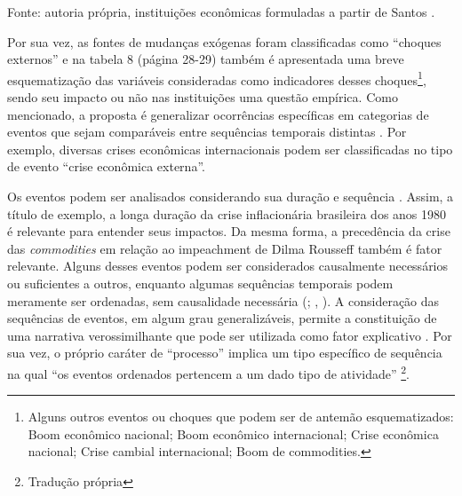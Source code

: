 \begin{table}[htbp]
\centering
\caption{Conjuntos preliminares de instituições relevantes}
\label{tab:cap03-conjuntos-instituicoes}
\end{table}

Fonte: autoria própria, instituições econômicas formuladas a partir de
Santos .

Por sua vez, as fontes de mudanças exógenas foram classificadas como
``choques externos'' e na tabela 8 (página 28-29) também é apresentada
uma breve esquematização das variáveis consideradas como indicadores
desses choques\footnote{Alguns outros eventos ou choques que podem ser
  de antemão esquematizados: Boom econômico nacional; Boom econômico
  internacional; Crise econômica nacional; Crise cambial internacional;
  Boom de commodities.}, sendo seu impacto ou não nas instituições uma
questão empírica. Como mencionado, a proposta é generalizar ocorrências
específicas em categorias de eventos que sejam comparáveis entre
sequências temporais distintas \citep{mahoneyfalleti2015}. Por exemplo,
diversas crises econômicas internacionais podem ser classificadas no
tipo de evento ``crise econômica externa''.

Os eventos podem ser analisados considerando sua duração e sequência
\citep{mahoneyfalleti2015}. Assim, a título de exemplo, a longa duração
da crise inflacionária brasileira dos anos 1980 é relevante para
entender seus impactos. Da mesma forma, a precedência da crise das
\emph{commodities} em relação ao impeachment de Dilma Rousseff também é
fator relevante. Alguns desses eventos podem ser considerados
causalmente necessários ou suficientes a outros, enquanto algumas
sequências temporais podem meramente ser ordenadas, sem causalidade
necessária (; \citeauthor{mahoneyfalleti2015},
\citeyear{mahoneyfalleti2015}). A consideração das sequências de
eventos, em algum grau generalizáveis, permite a constituição de uma
narrativa verossimilhante que pode ser utilizada como fator explicativo
\citep{abell_narrative_2004}. Por sua vez, o próprio caráter de
``processo'' implica um tipo específico de sequência na qual ``os
eventos ordenados pertencem a um dado tipo de atividade''
\citep[p.~214]{mahoneyfalleti2015}\footnote{Tradução própria}.

\begin{table}[htbp]
\centering
\caption{Categorias de eventos relativos a ``choques externos''}
\label{tab:cap03-choques-externos}
\end{table}

